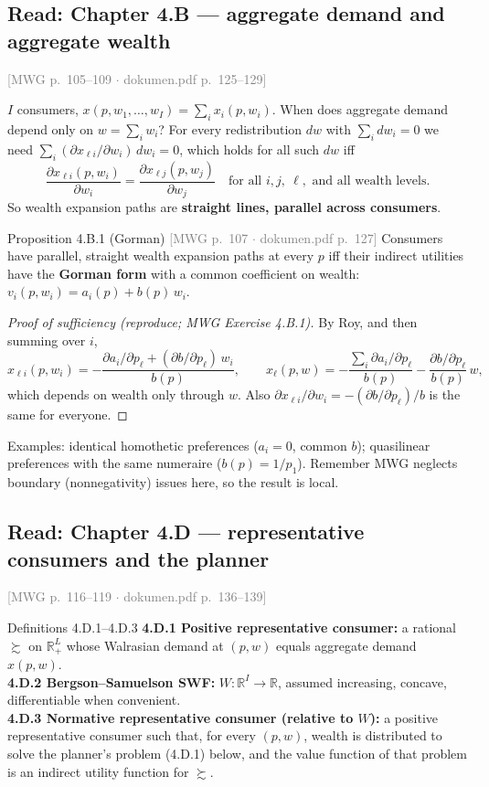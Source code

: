 \documentclass[11pt]{article}
\newcommand{\R}{\mathbb{R}}
\newcommand{\pref}{\succsim}
\newcommand{\mwg}[2]{\hfill{\small\textcolor{gray}{[MWG p.~#1 $\cdot$ dokumen.pdf p.~#2]}}}
\begin{document}
\subsection{Read: Chapter 4.B --- aggregate demand and aggregate wealth}
\mwg{105--109}{125--129}

$I$ consumers, $x(p,w_1,\dots,w_I)=\sum_ix_i(p,w_i)$. When does aggregate demand depend only on $w=\sum_iw_i$?
For every redistribution $dw$ with $\sum_idw_i=0$ we need $\sum_i(\partial x_{\ell i}/\partial w_i)\,dw_i=0$, which holds for all such $dw$ iff
\[
\frac{\partial x_{\ell i}(p,w_i)}{\partial w_i}=\frac{\partial x_{\ell j}(p,w_j)}{\partial w_j}\quad\text{for all }i,j,\ \ell,\text{ and all wealth levels.}
\]
So wealth expansion paths are \textbf{straight lines, parallel across consumers}.

\begin{prop}{Proposition 4.B.1 (Gorman) \mwg{107}{127}}
Consumers have parallel, straight wealth expansion paths at every $p$ iff their indirect utilities have the \textbf{Gorman form} with a common coefficient on wealth:
$v_i(p,w_i)=a_i(p)+b(p)\,w_i$.
\end{prop}
\begin{proof}[Proof of sufficiency (reproduce; MWG Exercise 4.B.1)]
By Roy, and then summing over $i$,
\[x_{\ell i}(p,w_i)=-\frac{\partial a_i/\partial p_\ell+(\partial b/\partial p_\ell)\,w_i}{b(p)},\qquad
x_\ell(p,w)=-\frac{\sum_i\partial a_i/\partial p_\ell}{b(p)}-\frac{\partial b/\partial p_\ell}{b(p)}\,w,\]
which depends on wealth only through $w$. Also $\partial x_{\ell i}/\partial w_i=-(\partial b/\partial p_\ell)/b$ is the same for everyone.
\end{proof}
Examples: identical homothetic preferences ($a_i=0$, common $b$); quasilinear preferences with the same numeraire ($b(p)=1/p_1$). Remember MWG neglects boundary (nonnegativity) issues here, so the result is local.

\subsection{Read: Chapter 4.D --- representative consumers and the planner}\label{sec:4d}
\mwg{116--119}{136--139}

\begin{defn}{Definitions 4.D.1--4.D.3}
\textbf{4.D.1 Positive representative consumer:} a rational $\pref$ on $\R^L_+$ whose Walrasian demand at $(p,w)$ equals aggregate demand $x(p,w)$.\\
\textbf{4.D.2 Bergson--Samuelson SWF:} $W:\R^I\to\R$, assumed increasing, concave, differentiable when convenient.\\
\textbf{4.D.3 Normative representative consumer (relative to $W$):} a positive representative consumer such that, for every $(p,w)$, wealth is distributed to solve the planner's problem (4.D.1) below, and the value function of that problem is an indirect utility function for $\pref$.
\end{defn}
\end{document}
